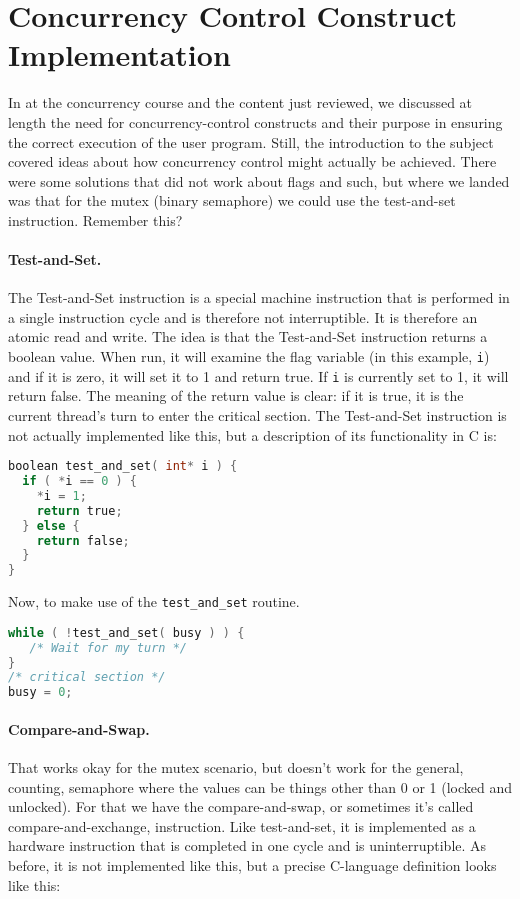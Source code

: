 





\section*{Concurrency Control Construct Implementation}
In at the concurrency course and the content just reviewed, we discussed at length the need for concurrency-control constructs and their purpose in ensuring the correct execution of the user program. Still, the introduction to the subject covered ideas about how concurrency control might actually be achieved. There were some solutions that did not work about flags and such, but where we landed was that for the mutex (binary semaphore) we could use the test-and-set instruction. Remember this?

\paragraph{Test-and-Set.}
The Test-and-Set instruction is a special machine instruction that is performed in a single instruction cycle and is therefore not interruptible. It is therefore an atomic read and write. The idea is that the Test-and-Set instruction returns a boolean value. When run, it will examine the flag variable (in this example, \texttt{i}) and if it is zero, it will set it to 1 and return true. If \texttt{i} is currently set to 1, it will return false. The meaning of the return value is clear: if it is true, it is the current thread's turn to enter the critical section. The Test-and-Set instruction is not actually implemented like this, but a description of its functionality in C is:

\begin{lstlisting}[language=C]
boolean test_and_set( int* i ) {
  if ( *i == 0 ) {
    *i = 1;
    return true;
  } else {
    return false;
  }
}
\end{lstlisting}


Now, to make use of the \texttt{test\_and\_set} routine.

\begin{lstlisting}[language=C]
while ( !test_and_set( busy ) ) {
   /* Wait for my turn */
}
/* critical section */
busy = 0;
\end{lstlisting}

\paragraph{Compare-and-Swap.} That works okay for the mutex scenario, but doesn't work for the general, counting, semaphore where the values can be things other than 0 or 1 (locked and unlocked). For that we have the compare-and-swap, or sometimes it's called compare-and-exchange, instruction. Like test-and-set, it is implemented as a hardware instruction that is completed in one cycle and is uninterruptible. As before, it is not implemented like this, but a precise C-language definition looks like this:

